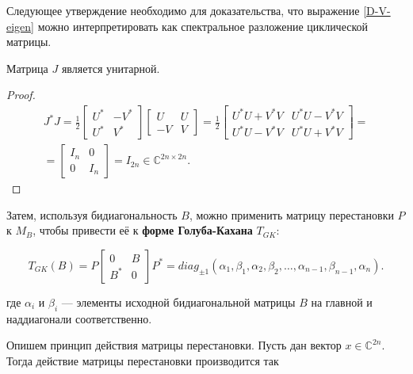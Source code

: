 Следующее утверждение необходимо для доказательства, что выражение \eqref{D-V-eigen} можно интерпретировать как спектральное разложение циклической матрицы.

\begin{claim} \label{J-unitary}
    Матрица \(J\) является унитарной.
\end{claim}
\begin{proof}
    \begin{equation*}
        \begin{split}
            J^* J= \frac{1}{2} \begin{bmatrix} U^* &-V^*\\ U^* & V^* \end{bmatrix} \begin{bmatrix} U & U \\ -V & V \end{bmatrix} = \frac{1}{2} \begin{bmatrix}
        U^*U+V^*V & U^*U-V^*V \\ U^*U-V^*V & U^*U+V^*V
    \end{bmatrix} =\\[6pt] = \begin{bmatrix}
        I_n & 0 \\ 0 & I_n
    \end{bmatrix} = I_{2n} \in \mathbb{C}^{2n \times 2n}.
        \end{split}
    \end{equation*}
\end{proof}

Затем, используя бидиагональность \( B \), можно применить матрицу перестановки \( P \) к \( M_B \), чтобы привести её к \textbf{форме Голуба-Кахана} \( T_{GK} \):

\begin{equation}
T_{GK}(B) = P \begin{bmatrix} 0 & B \\ B^* & 0 \end{bmatrix} P^* = diag_{\pm 1}(\alpha_1,\beta_1,\alpha_2,\beta_2,\dots,\alpha_{n-1},\beta_{n-1},\alpha_{n}).
\end{equation}

где \( \alpha_i \) и \( \beta_i \) — элементы исходной бидиагональной матрицы \( B \) на главной и наддиагонали соответственно. 

Опишем принцип действия матрицы перестановки. Пусть дан вектор \(x \in \mathbb{C}^{2n} \). Тогда действие матрицы перестановки производится так

